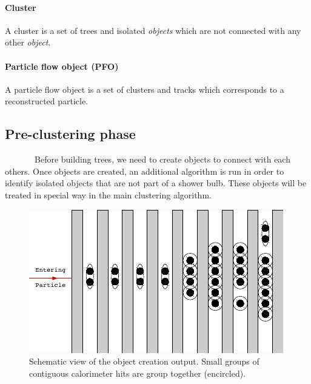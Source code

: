 \documentclass[cits]{JINST}
\begin{document}
\paragraph*{Cluster} A cluster is a set of trees and isolated \textit{objects} which are not connected with any other \textit{object}.

\paragraph*{Particle flow object (PFO)} A particle flow object is a set of clusters and tracks which corresponds to a reconstructed particle.

\subsection{Pre-clustering phase} 

~~~~~~~Before building trees, we need to create objects to connect with each others. Once objects are created, an additional algorithm is run in order to identify isolated objects that are not part of a shower bulb. These objects will be treated in special way in the main clustering algorithm.

\begin{figure}
  \vspace{-20pt}
  \begin{center}
    \includegraphics[width=\linewidth]{ObjectCreationAfter.pdf}
  \end{center}
  \vspace{-10pt}
  \caption{\label{ARBOR_OBJECT_CREATION} Schematic view of the object creation output. Small groups of contiguous calorimeter hits are group together (encircled).}
  \vspace{-20pt}
\end{figure}
\end{document}
